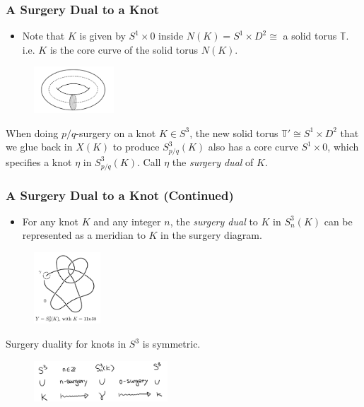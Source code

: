 \documentclass{beamer}
\theoremstyle{ex}
\theoremstyle{rem}
\begin{document}
	\begin{frame}
	\frametitle{A Surgery Dual to a Knot}
		\begin{itemize}
		\item Note that $K$ is given by $S^1 \times {0}$ inside $N(K) = S^1 \times D^2 \cong$ a solid torus $\mathbb{T}$. i.e. $K$ is the core curve of the solid torus $N(K)$. 
		\end{itemize}
		\begin{figure}
			\centering
			\includegraphics[width=30mm]{core.png}
		\end{figure}
		\begin{definition}
		When doing $p/q$-surgery on a knot $K \in S^3$, the new solid torus $\mathbb{T'} \cong S^1 \times D^2$ that we glue back in $X(K)$ to produce $S^3_{p/q}(K)$ also has a core curve $S^1 \times {0}$, which specifies a knot $\eta$ in $S^3_{p/q}(K)$. Call $\eta$ the \textit{surgery dual} of $K$.
		\end{definition}		
	\end{frame}

	\begin{frame}
	\frametitle{A Surgery Dual to a Knot (Continued)}
		\begin{itemize} 
		\item For any knot $K$ and any integer $n$, the \textit{surgery dual} to $K$ in $S^3_n(K)$ can be represented as a meridian to $K$ in the surgery diagram. 
		\end{itemize}
		\begin{figure}
			\centering
			\includegraphics[width=25mm]{dual.png}
		\end{figure}
		\begin{lemma}
		Surgery duality for knots in $S^3$ is symmetric. 
		\end{lemma}
		\begin{figure}
			\centering
			\includegraphics[width=50mm]{Symmetry.jpg}
		\end{figure}
	\end{frame}
\end{document}
